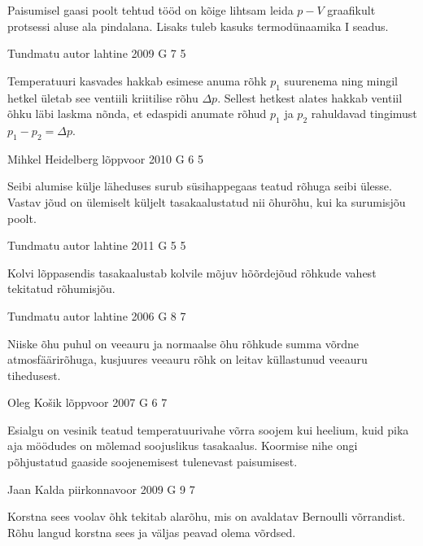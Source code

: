 \documentclass[11pt, twoside]{article}
\begin{document}
{{\ifHint
Paisumisel gaasi poolt tehtud tööd on kõige lihtsam leida $p-V$ graafikult protsessi aluse ala pindalana. Lisaks tuleb kasuks termodünaamika I seadus.
\fi
}

{Tundmatu autor} %
{lahtine} %
{2009} %
{G 7} %
{5} %
{

\ifHint
Temperatuuri kasvades hakkab esimese anuma rõhk $p_1$ suurenema ning mingil hetkel ületab see ventiili kriitilise rõhu $\Delta p$. Sellest hetkest alates hakkab ventiil õhku läbi laskma nõnda, et edaspidi anumate rõhud $p_1$ ja $p_2$ rahuldavad tingimust $p_1 - p_2 = \Delta p$.
\fi
}

{Mihkel Heidelberg} %
{lõppvoor} %
{2010} %
{G 6} %
{5} %
{

\ifHint
Seibi alumise külje läheduses surub süsihappegaas teatud rõhuga seibi ülesse. Vastav jõud on ülemiselt küljelt tasakaalustatud nii õhurõhu, kui ka surumisjõu poolt.
\fi
}

{Tundmatu autor} %
{lahtine} %
{2011} %
{G 5} %
{5} %
{

\ifHint
Kolvi lõppasendis tasakaalustab kolvile mõjuv hõõrdejõud rõhkude vahest tekitatud rõhumisjõu.
\fi
}

{Tundmatu autor} %
{lahtine} %
{2006} %
{G 8} %
{7} %
{

\ifHint
Niiske õhu puhul on veeauru ja normaalse õhu rõhkude summa võrdne atmosfäärirõhuga, kusjuures veeauru rõhk on leitav küllastunud veeauru tihedusest.
\fi
}

{Oleg Košik} %
{lõppvoor} %
{2007} %
{G 6} %
{7} %
{

\ifHint
Esialgu on vesinik teatud temperatuurivahe võrra soojem kui heelium, kuid pika aja möödudes on mõlemad soojuslikus tasakaalus. Koormise nihe ongi põhjustatud gaaside soojenemisest tulenevast paisumisest.
\fi
}

{Jaan Kalda} %
{piirkonnavoor} %
{2009} %
{G 9} %
{7} %
{

\ifHint
Korstna sees voolav õhk tekitab alarõhu, mis on avaldatav Bernoulli võrrandist. Rõhu langud korstna sees ja väljas peavad olema võrdsed.
\fi
}

}
\end{document}
